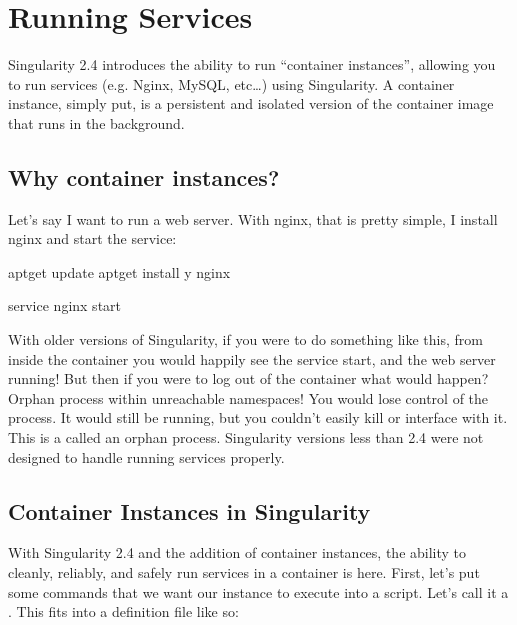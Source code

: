 \documentclass[letterpaper,10pt,english]{sphinxmanual}
\begin{document}
\chapter{Running Services}
\label{\detokenize{running_services:running-services}}\label{\detokenize{running_services:id1}}\label{\detokenize{running_services::doc}}
Singularity 2.4 introduces the ability to run “container instances”,
allowing you to run services (e.g. Nginx, MySQL, etc…) using
Singularity. A container instance, simply put, is a persistent and
isolated version of the container image that runs in the background.


\section{Why container instances?}
\label{\detokenize{running_services:why-container-instances}}
Let’s say I want to run a web server. With nginx, that is pretty simple, I install nginx and start the service:

%
\begin{sphinxVerbatim}[commandchars=\\\{\}]
apt\PYGZhy{}get update \PYGZam{}\PYGZam{} apt\PYGZhy{}get install \PYGZhy{}y nginx

service nginx start
\end{sphinxVerbatim}

With older versions of Singularity, if you were to do something like
this, from inside the container you would happily see the service
start, and the web server running! But then if you were to log out of
the container what would happen?
Orphan process within unreachable namespaces!
You would lose control of the process. It would still be running, but
you couldn’t easily kill or interface with it. This is a called an
orphan process. Singularity versions less than 2.4 were not designed
to handle running services properly.


\section{Container Instances in Singularity}
\label{\detokenize{running_services:container-instances-in-singularity}}
With Singularity 2.4 and the addition of container instances, the
ability to cleanly, reliably, and safely run services in a container is
here. First, let’s put some commands that we want our instance to
execute into a script. Let’s call it a . This fits into a definition
file like so:
\end{document}
